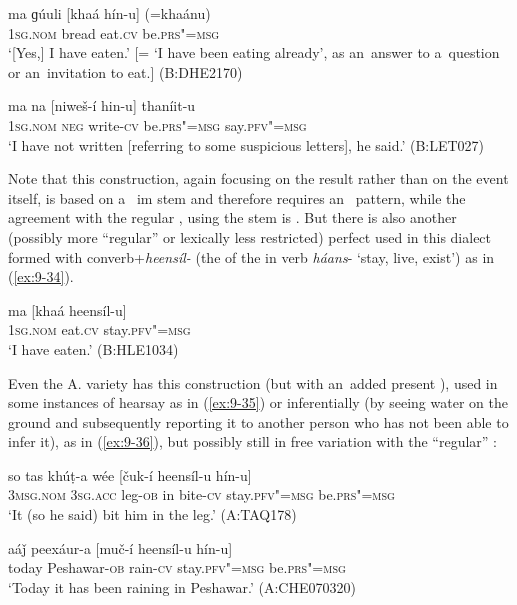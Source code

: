 \begin{exe}
\ex
\label{ex:9-32}
\gll ma ɡúuli [khaá hín-u] (=khaánu)  \\
\textsc{1sg.nom} bread eat.\textsc{cv} be.\textsc{prs"=msg} \\
\glt `[Yes,] I have eaten.' [= `I have been eating already', as an~answer to a~question or an~invitation to eat.] (B:DHE2170)

\ex
\label{ex:9-33}
\gll ma na [niweš-í hin-u] thaníit-u  \\
\textsc{1sg.nom} \textsc{neg} write-\textsc{cv} be.\textsc{prs"=msg} say.\textsc{pfv"=msg} \\
\glt `I have not written [referring to some suspicious letters], he said.' (B:LET027)
\end{exe}

Note that this construction, again focusing on the result rather than on the event itself, is based on a~ im stem and therefore requires an~ pattern, while the agreement with the regular , using the   stem is . But there is also another (possibly more ``regular'' or lexically less restricted) perfect used in this dialect formed with converb+\textit{heensíl-} (the  of the in verb \textit{háans}- `stay, live, exist') as in (\ref{ex:9-34}).

\begin{exe}
\ex
\label{ex:9-34}
\gll ma [khaá heensíl-u]  \\
\textsc{1sg.nom} eat.\textsc{cv} stay.\textsc{pfv"=msg} \\
\glt `I have eaten.' (B:HLE1034)
\end{exe}

Even the A. variety has this construction (but with an~added present ), used in some instances of hearsay as in (\ref{ex:9-35}) or inferentially (by seeing water on the ground and subsequently reporting it to another person who has not been able to infer it), as in (\ref{ex:9-36}), but possibly still in free variation with the ``regular'' :

\begin{exe}
\ex
\label{ex:9-35}
\gll so tas khúṭ-a wée [čuk-í heensíl-u hín-u] \\
\textsc{3msg.nom} \textsc{3sg.acc} leg-\textsc{ob} in bite-\textsc{cv} stay.\textsc{pfv"=msg} be.\textsc{prs"=msg} \\
\glt `It (so he said) bit him in the leg.' (A:TAQ178)

\ex
\label{ex:9-36}
\gll aáǰ peexáur-a [muč-í heensíl-u hín-u]  \\
today Peshawar-\textsc{ob} rain-\textsc{cv} stay.\textsc{pfv"=msg} be.\textsc{prs"=msg} \\
\glt `Today it has been raining in Peshawar.' (A:CHE070320)
\end{exe}

